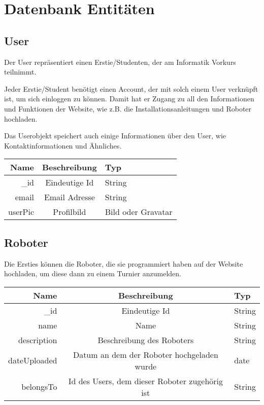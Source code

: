 \documentclass[Info_VK_Website_Dokumentation.tex]{subfiles}
\begin{document}
	
\chapter{Datenbank Entitäten}

\section{User}

Der User repräsentiert einen Erstie/Studenten, der am Informatik Vorkurs teilnimmt.

Jeder Erstie/Student benötigt einen Account, der mit solch einem User verknüpft ist, um sich einloggen zu können. Damit hat er Zugang zu all den Informationen und Funktionen der Website, wie z.B. die Installationsanleitungen und Roboter hochladen.

Das Userobjekt speichert auch einige Informationen über den User, wie Kontaktinformationen und Ähnliches.

\begin{table}[H]
\centering
\begin{tabular}{r | c | l}
\textbf{Name} & \textbf{Beschreibung} & \textbf{Typ} \\
\hline
\hline
\_id  & Eindeutige Id & String \\
\hline
email   & Email Adresse & String \\
\hline
userPic & Profilbild   & Bild oder Gravatar \\
\end{tabular}
\end{table}


\section{Roboter}

Die Ersties können die Roboter, die sie programmiert haben auf der Website hochladen, um diese dann zu einem Turnier anzumelden.


\begin{table}[H]
\centering
\begin{tabular}{ r | c | l }
\textbf{Name} & \textbf{Beschreibung} & \textbf{Typ} \\
\hline
\hline
\_id       & Eindeutige Id & String \\
\hline
name     & Name          & String \\
\hline
description & Beschreibung des Roboters & String \\
\hline
dateUploaded & Datum an dem der Roboter hochgeladen wurde & date \\ 
\hline
belongsTo & Id des Users, dem dieser Roboter zugehörig ist & String \\
\end{tabular}
\end{table}
\end{document}
